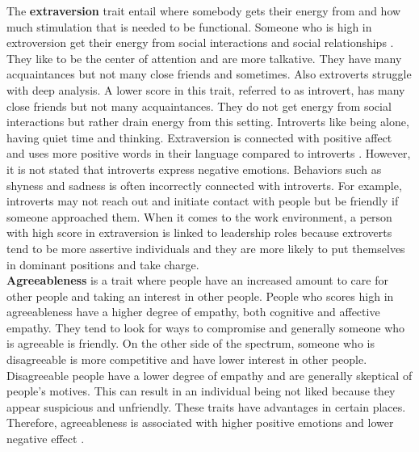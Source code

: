 The \textbf{extraversion} trait entail where somebody gets their energy from and how much stimulation that is needed to be functional. Someone who is high in extroversion get their energy from social interactions and social relationships \cite{big-five-john1999big}. They like to be the center of attention and are more talkative. They have many acquaintances but not many close friends and sometimes. Also extroverts struggle with deep analysis. A lower score in this trait, referred to as introvert, has many close friends but not many acquaintances. They do not get energy from social interactions but rather drain energy from this setting. Introverts like being alone, having quiet time and thinking. Extraversion is connected with positive affect and uses more positive words in their language compared to introverts \cite{extraversion1-komulainen2014effect} \cite{extraversion2-pennebaker1999linguistic}. However, it is not stated that introverts express negative emotions. Behaviors such as shyness and sadness is often incorrectly connected with introverts. For example, introverts may not reach out and initiate contact with people but be friendly if someone approached them. When it comes to the work environment, a person with high score in extraversion is linked to leadership roles because extroverts tend to be more assertive individuals and they are more likely to put themselves in dominant positions and take charge.  \\

\textbf{Agreeableness} is a trait where people have an increased amount to care for other people and taking an interest in other people. People who scores high in agreeableness  have a higher degree of empathy, both cognitive and affective empathy. They tend to look for ways to compromise and generally someone who is agreeable is friendly. On the other side of the spectrum, someone who is disagreeable is more competitive and have lower interest in other people. Disagreeable people have a lower degree of empathy and are generally skeptical of people's motives. This can result in an individual being not liked because they appear suspicious and unfriendly. These traits have advantages in certain places. Therefore, agreeableness is associated with higher positive emotions and lower negative effect \cite{personality_emotions_link}. \\

